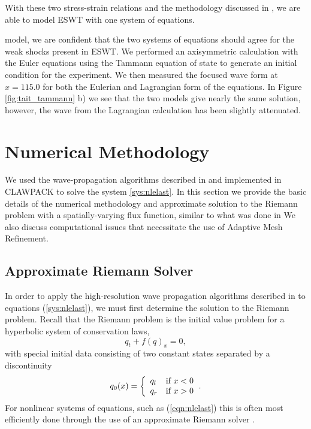 \documentclass{article}
\newenvironment{choice}{\left\{ \begin{array}{ll}}{\end{array}\right.}
\begin{document}
With these two stress-strain relations and the methodology discussed in , we are able to 
model ESWT with one system of equations.

model, we are confident that the two systems of equations should agree for the weak shocks present in 
ESWT.  We performed an axisymmetric calculation with the Euler equations using the Tammann 
equation of state to generate an initial condition for the experiment.  We then measured the focused 
wave form at $x=115.0$ for both the Eulerian and Lagrangian form of the equations.  In Figure 
\ref{fig:tait_tammann} b) we see that the two models give nearly the same solution, however, the wave 
from the Lagrangian calculation has been slightly attenuated.


\section{Numerical Methodology}
\label{sec:numerics}
We used the wave-propagation algorithms described in \cite{rjl_book} and implemented in CLAWPACK 
\cite{clawpack} to solve the system \ref{sys:nlelast}.  In this section we provide the basic details of the 
numerical methodology and approximate solution to the Riemann problem with a spatially-varying flux 
function, similar to what was done in \cite{rjl_nonlinear}  We also discuss computational issues that 
necessitate the use of Adaptive Mesh Refinement. 

\subsection{Approximate Riemann Solver}
\label{sec:riemann_solver}
In order to apply the high-resolution wave propagation algorithms described in 
\cite{rjl_book,rjl_nolnlinear} to equations (\ref{sys:nlelast}), we must first determine the solution to the 
Riemann problem.  Recall that the Riemann problem is the initial value problem for a hyperbolic system 
of conservation laws, 
$$
	q_t + f(q)_x = 0, 
$$
with special initial data consisting of two constant states separated by a discontinuity
$$
	    q_{0}(x) = \begin{choice} q_l &\text{if}~x<0 \\
                    q_r &\text{if}~x>0 \end{choice}.
$$
For nonlinear systems of equations, such as (\ref{eqn:nlelast}) this is often most efficiently done through 
the use of an approximate Riemann solver \cite{rjl_book}.  
\end{document}
